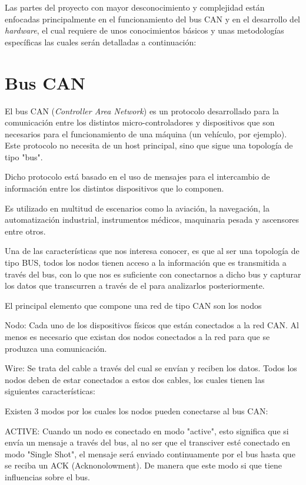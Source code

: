 
Las partes del proyecto con mayor desconocimiento y complejidad están enfocadas principalmente en el funcionamiento del bus CAN y en el desarrollo del \emph{hardware}, el cual requiere de unos conocimientos básicos y unas metodologías específicas las cuales serán detalladas a continuación:

\section{Bus CAN}\label{bus_can}

El bus CAN (\emph{Controller Area Network}) es un protocolo desarrollado para la comunicación entre los distintos micro-controladores y dispositivos que son necesarios para el funcionamiento de una máquina (un vehículo, por ejemplo). Este protocolo no necesita de un host principal, sino que sigue una topología de tipo "bus".

Dicho protocolo está basado en el uso de mensajes para el intercambio de información entre los distintos dispositivos que lo componen.

Es utilizado en multitud de escenarios como la aviación, la navegación, la automatización industrial, instrumentos médicos, maquinaria pesada y ascensores entre otros.

Una de las características que nos interesa conocer, es que al ser una topología de tipo BUS, todos los nodos tienen acceso a la información que es transmitida a través del bus, con lo que nos es suficiente con conectarnos a dicho bus y capturar los datos que transcurren a través de el para analizarlos posteriormente.

El principal elemento que compone una red de tipo CAN son los nodos

Nodo:
Cada uno de los dispositivos físicos que están conectados a la red CAN. Al menos es necesario que existan dos nodos conectados a la red para que se produzca una comunicación.

Wire: Se trata del cable a través del cual se envían y reciben los datos. Todos los nodos deben de estar conectados a estos dos cables, los cuales tienen las siguientes características:


Existen 3 modos por los cuales los nodos pueden conectarse al bus CAN:

ACTIVE: Cuando un nodo es conectado en modo "active", esto significa que si envía un mensaje a través del bus, al no ser que el transciver esté conectado en modo "Single Shot", el mensaje será enviado continuamente por el bus hasta que se reciba un ACK (Acknonolowment). De manera que este modo si que tiene influencias sobre el bus. 

